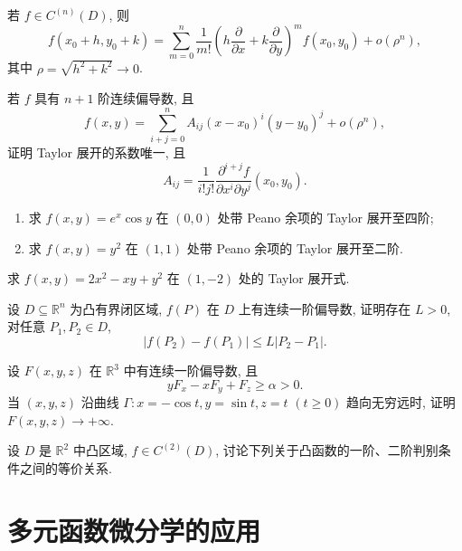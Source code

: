 \documentclass[../../数学分析培优讲义.tex]{subfiles}
\begin{document}
\begin{theorem}
若 $f\in C^{(n)}(D)$, 则
\[
    f(x_0+h,y_0+k)
    =\sum\limits_{m=0}^n\dfrac{1}{m!}
    \left(h\dfrac{\partial}{\partial x}+k\dfrac{\partial}{\partial y}\right)^m f(x_0,y_0)
    +o(\rho^n),
\]
其中 $\rho=\sqrt{h^2+k^2}\to0$.
\end{theorem}

\begin{example}[\markstar]
若 $f$ 具有 $n+1$ 阶连续偏导数, 且
\[
    f(x,y)=\sum\limits_{i+j=0}^nA_{ij}(x-x_0)^i(y-y_0)^j+o(\rho^n),
\]
证明 Taylor 展开的系数唯一, 且
\[
    A_{ij}=\dfrac{1}{i!j!}
    \dfrac{\partial^{i+j}f}{\partial x^i\partial y^j}(x_0,y_0).
\]
\end{example}
\exampleblank

\begin{example}
\begin{enumerate}[label=(\arabic*)]
    \item 求 $f(x,y)=e^x\cos y$ 在 $(0,0)$ 处带 Peano 余项的 Taylor 展开至四阶;
    \item 求 $f(x,y)=y^2$ 在 $(1,1)$ 处带 Peano 余项的 Taylor 展开至二阶.
\end{enumerate}
\end{example}
\exampleblank

\begin{example}
求 $f(x,y)=2x^2-xy+y^2$ 在 $(1,-2)$ 处的 Taylor 展开式.
\end{example}
\exampleblank

\begin{example}
设 $D\subseteq\mathbb{R}^n$ 为凸有界闭区域, $f(P)$ 在 $D$ 上有连续一阶偏导数, 证明存在 $L>0$, 对任意 $P_1,P_2\in D$,
\[
    |f(P_2)-f(P_1)|\leq L|P_2-P_1|.
\]
\end{example}
\exampleblank

\begin{example}
设 $F(x,y,z)$ 在 $\mathbb{R}^3$ 中有连续一阶偏导数, 且
\[
    yF_x-xF_y+F_z\geq\alpha>0.
\]
当 $(x,y,z)$ 沿曲线 $\Gamma:x=-\cos t,y=\sin t,z=t$ $(t\geq0)$ 趋向无穷远时, 证明 $F(x,y,z)\to+\infty$.
\end{example}
\exampleblank

\begin{example}
设 $D$ 是 $\mathbb{R}^2$ 中凸区域, $f\in C^{(2)}(D)$, 讨论下列关于凸函数的一阶、二阶判别条件之间的等价关系.
\end{example}
\exampleblank


\newpage

\section{多元函数微分学的应用}
\end{document}
